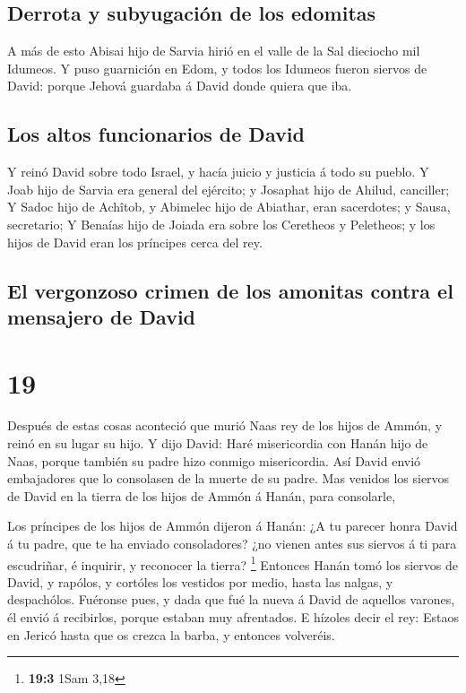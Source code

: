 \hypertarget{derrota-y-subyugaciuxf3n-de-los-edomitas}{%
\subsection{Derrota y subyugación de los
edomitas}\label{derrota-y-subyugaciuxf3n-de-los-edomitas}}

 A más de esto Abisai hijo de Sarvia hirió en el valle de
la Sal dieciocho mil Idumeos.  Y puso guarnición en Edom, y
todos los Idumeos fueron siervos de David: porque Jehová guardaba á
David donde quiera que iba.

\hypertarget{los-altos-funcionarios-de-david}{%
\subsection{Los altos funcionarios de
David}\label{los-altos-funcionarios-de-david}}

 Y reinó David sobre todo Israel, y hacía juicio y justicia
á todo su pueblo.  Y Joab hijo de Sarvia era general del
ejército; y Josaphat hijo de Ahilud, canciller;  Y Sadoc
hijo de Achîtob, y Abimelec hijo de Abiathar, eran sacerdotes; y Sausa,
secretario;  Y Benaías hijo de Joiada era sobre los
Ceretheos y Peletheos; y los hijos de David eran los príncipes cerca del
rey.

\hypertarget{el-vergonzoso-crimen-de-los-amonitas-contra-el-mensajero-de-david}{%
\subsection{El vergonzoso crimen de los amonitas contra el mensajero de
David}\label{el-vergonzoso-crimen-de-los-amonitas-contra-el-mensajero-de-david}}

\hypertarget{section-18}{%
\section{19}\label{section-18}}

 Después de estas cosas aconteció que murió Naas rey de los
hijos de Ammón, y reinó en su lugar su hijo.  Y dijo David:
Haré misericordia con Hanán hijo de Naas, porque también su padre hizo
conmigo misericordia. Así David envió embajadores que lo consolasen de
la muerte de su padre. Mas venidos los siervos de David en la tierra de
los hijos de Ammón á Hanán, para consolarle,

 Los príncipes de los hijos de Ammón dijeron á Hanán: ¿A tu
parecer honra David á tu padre, que te ha enviado consoladores? ¿no
vienen antes sus siervos á ti para escudriñar, é inquirir, y reconocer
la tierra? \footnote{\textbf{19:3} 1Sam 3,18}  Entonces
Hanán tomó los siervos de David, y rapólos, y cortóles los vestidos por
medio, hasta las nalgas, y despachólos.  Fuéronse pues, y
dada que fué la nueva á David de aquellos varones, él envió á
recibirlos, porque estaban muy afrentados. E hízoles decir el rey:
Estaos en Jericó hasta que os crezca la barba, y entonces volveréis.

